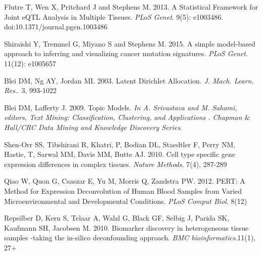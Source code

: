 \documentclass[10pt,letterpaper]{article}
\begin{document}
\begin{thebibliography}{9}
%



Flutre T,  Wen X,  Pritchard J and Stephens M. 2013.
A Statistical Framework for Joint eQTL Analysis in Multiple Tissues.
\textit{PLoS Genet}. 9(5): e1003486. doi:10.1371/journal.pgen.1003486

Shiraishi Y, Tremmel G, Miyano S and Stephens M. 2015.
 A simple model-based approach to inferring and visualizing cancer mutation signatures.
\textit{ PLoS Genet}. 11(12): e1005657


Blei DM,  Ng AY, Jordan MI. 2003.
Latent Dirichlet Allocation.
\textit{J. Mach. Learn. Res.}. 3, 993-1022

Blei DM, Lafferty J. 2009.
Topic Models.
\textit{In A. Srivastava and M. Sahami, editors, Text Mining: Classification, Clustering, and Applications . Chapman $\&$ Hall/CRC Data Mining and Knowledge Discovery Series}.

 Shen-Orr SS,  Tibshirani R,   Khatri, P,  Bodian DL,  Staedtler F,  Perry NM,  Hastie, T,   Sarwal MM,  Davis MM,  Butte AJ. 2010.
 Cell type specific gene expression   differences   in   complex   tissues.
 \textit{Nature   Methods}.  7(4),   287-289

Qiao W,  Quon G, Csaszar E, Yu  M,  Morris Q,  Zandstra  PW. 2012.
PERT: A   Method   for   Expression   Deconvolution   of   Human   Blood   Samples   from   Varied
Microenvironmental   and   Developmental   Conditions.
\textit{PLoS   Comput   Biol}.  8(12)

 Repsilber D,  Kern S,  Telaar A,  Walzl G,  Black GF,   Selbig   J,   Parida  SK,  Kaufmann SH,  Jacobsen M. 2010.
 Biomarker discovery in heterogeneous tissue samples -taking the in-silico deconfounding approach.
 \textit{BMC bioinformatics}.11(1), 27+


\end{thebibliography}
\end{document}
